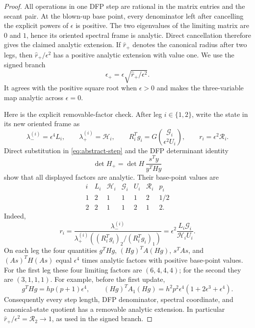 \documentclass[smallextended,envcountsame]{svjour3}
\begin{document}
\begin{proof}
All operations in one DFP step are rational in the matrix entries and the
secant pair.  At the blown-up base point, every denominator left after
cancelling the explicit powers of $\epsilon$ is positive.  The two eigenvalues
of the limiting matrix are $0$ and $1$, hence its oriented spectral frame is
analytic.  Direct cancellation therefore gives the claimed analytic
extension.  If $\widehat r_+$ denotes the canonical radius after two legs,
then $\widehat r_+/\epsilon^2$ has a positive analytic extension with value
one.  We use the signed branch
\[
\epsilon_+=\epsilon
\sqrt{\widehat r_+/\epsilon^2}.
\]
It agrees with the positive square root when $\epsilon>0$ and makes the
three-variable map analytic across $\epsilon=0$.

Here is the explicit removable-factor check.  After leg $i\in\{1,2\}$,
write the state in its new oriented frame as
\[
\lambda_-^{(i)}=\epsilon^4L_i,\qquad
\lambda_+^{(i)}=\mathcal H_i,\qquad
R_i^Tg_i
=G\binom{\mathcal G_i}{\epsilon^2U_i},\qquad
r_i=\epsilon^2\mathcal R_i.
\]
Direct substitution in \eqref{eq:abstract-step} and the DFP determinant
identity
\[
\det H_+=\det H\,\frac{s^Ty}{y^THy}
\]
show that all displayed factors are analytic.  Their base-point
values are
\[
\begin{array}{c|cccccc}
i&L_i&\mathcal H_i&\mathcal G_i&U_i&\mathcal R_i&p_i\\ \hline
1&2&1&1&1&2&1/2\\
2&2&1&1&2&1&2.
\end{array}
\]
Indeed,
\[
r_i=\frac{\lambda_-^{(i)}}
{\lambda_+^{(i)}
 ((R_i^Tg_i)_2/(R_i^Tg_i)_1)}
=\epsilon^2\frac{L_i\mathcal G_i}{\mathcal H_iU_i}.
\]
On each leg the four quantities
$g^THg$, $(Hg)^TA(Hg)$, $s^TAs$, and $(As)^TH(As)$ equal
$\epsilon^4$ times analytic factors with positive base-point values.
For the first leg these four limiting factors are $(6,4,4,4)$; for the
second they are $(3,1,1,1)$.  For example, before the first update,
\[
g^THg=hp(p+1)\epsilon^4,
\qquad
(Hg)^TA_1(Hg)=h^2p^2\epsilon^4
 (1+2\epsilon^3+\epsilon^4).
\]
Consequently every step length, DFP denominator, spectral coordinate, and
canonical-state quotient has a removable analytic extension.  In particular
$\widehat r_+/\epsilon^2=\mathcal R_2\to1$, as used in the signed branch.


\end{proof}
\end{document}
